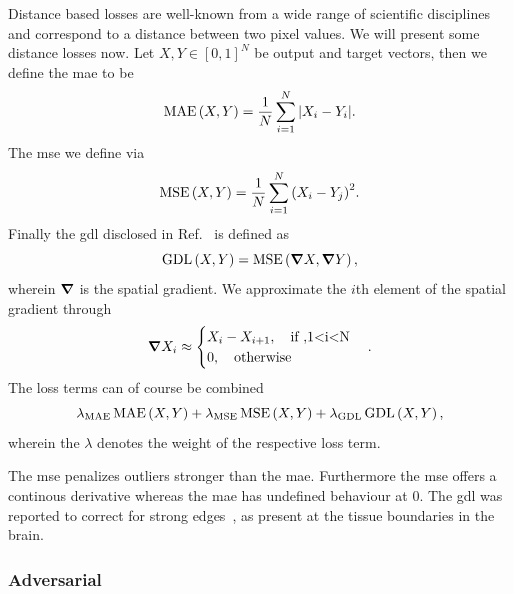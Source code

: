 Distance based losses are well-known from a wide range of scientific
disciplines and correspond to a distance between two pixel values. We will
present some distance losses now. Let $X,Y\in{[0,1]}^N$ be output and target
vectors, then we define the \gls{mae} to be
\begin{equation}
  \operatorname{MAE}\left(X,Y\right)
  =
  \frac{1}{N}\sum_{i=1}^N
  \abs{X_i-Y_i}
  \label{eq:dist:mae}.
\end{equation}
The \gls{mse} we define via
\begin{equation}
  \operatorname{MSE}\left(X,Y\right)
  =
  \frac{1}{N}\sum_{i=1}^N
  {\left(X_i-Y_j\right)}^2
  \label{eq:dist:mse}.
\end{equation}
Finally the \gls{gdl} disclosed in Ref.~\cite{Nie16} is defined as
\begin{equation}
  \operatorname{GDL}\left(X,Y\right)
  =
  \operatorname{MSE}\left(\grad X,\grad Y\right)
  \label{eq:dist:gdl},
\end{equation}
wherein $\grad$ is the spatial gradient. We approximate the $i$th element
of the spatial gradient through
\begin{equation}
  \grad X_i
  \approx
  \begin{cases}
    X_i-X_{i+1}\qc\text{if }, $1<i<N$\\
    0\qc\text{otherwise}
  \end{cases}
  \label{eq:dist:grad}.
\end{equation}
The loss terms can of course be combined
\begin{equation}
  \lambda_\text{MAE}\operatorname{MAE}\left(X,Y\right)
  +
  \lambda_\text{MSE}\operatorname{MSE}\left(X,Y\right)
  +
  \lambda_\text{GDL}\operatorname{GDL}\left(X,Y\right),
\end{equation}
wherein the $\lambda$ denotes the weight of the respective loss term.

The \gls{mse} penalizes outliers stronger than the \gls{mae}. Furthermore the
\gls{mse} offers a continous derivative whereas the \gls{mae} has undefined
behaviour at $0$. The \gls{gdl} was reported to correct for strong
edges~\cite{Nie16}, as present at the tissue boundaries in the brain.

\subsubsection{Adversarial}

